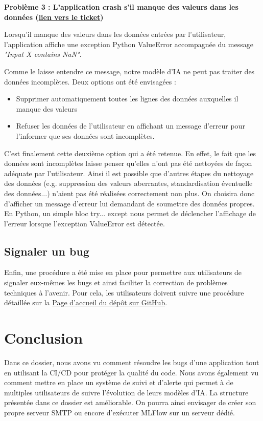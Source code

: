 \documentclass[french]{article}
\begin{document}
    \textbf{Problème 3 : L'application crash s'il manque des valeurs dans les données (\href{https://github.com/vinpap/mathfinder/issues/4}{lien vers le ticket})}

    Lorsqu'il manque des valeurs dans les données entrées par l'utilisateur, l'application affiche une exception Python ValueError accompagnée du message \textit{"Input X contains NaN"}.

    Comme le laisse entendre ce message, notre modèle d'IA ne peut pas traiter des données incomplètes. Deux options ont été envisagées :
    \begin{itemize}
        \item Supprimer automatiquement toutes les lignes des données auxquelles il manque des valeurs
        \item Refuser les données de l'utilisateur en affichant un message d'erreur pour l'informer que ses données sont incomplètes.
    \end{itemize}
    C'est finalement cette deuxième option qui a été retenue. En effet, le fait que les données sont incomplètes laisse penser qu'elles n'ont pas été nettoyées de façon adéquate par l'utilisateur. Ainsi il est possible que d'autres étapes du nettoyage des données (e.g. suppression des valeurs aberrantes, standardisation éventuelle des données...) n'aient pas été réalisées correctement non plus. On choisira donc d'afficher un message d'erreur lui demandant de soumettre des données propres. En Python, un simple bloc try... except nous permet de déclencher l'affichage de l'erreur lorsque l'exception ValueError est détectée.

    \subsection{Signaler un bug}
    Enfin, une procédure a été mise en place pour permettre aux utilisateurs de signaler eux-mêmes les bugs et ainsi faciliter la correction de problèmes techniques à l'avenir. Pour cela, les utilisateurs doivent suivre une procédure détaillée sur la \href{https://github.com/vinpap/mathfinder}{Page d'accueil du dépôt sur GitHub}.


    \section{Conclusion}
    Dans ce dossier, nous avons vu comment résoudre les bugs d'une application tout en utilisant la CI/CD pour protéger la qualité du code. Nous avons également vu comment mettre en place un système de suivi et d'alerte qui permet à de multiples utilisateurs de suivre l'évolution de leurs modèles d'IA. La structure présentée dans ce dossier est améliorable. On pourra ainsi envisager de créer son propre serveur SMTP ou encore d'exécuter MLFlow sur un serveur dédié.
    \newpage
\end{document}

